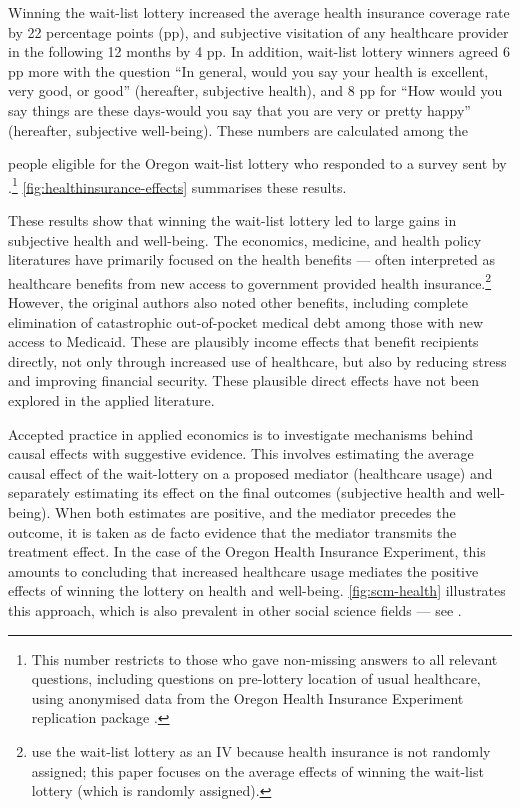Winning the wait-list lottery increased the average health insurance coverage rate by 22 percentage points (pp), and subjective visitation of any healthcare provider in the following 12 months by 4 pp.
In addition, wait-list lottery winners agreed 6 pp more with the question ``In general, would you say your health is excellent, very good, or good'' (hereafter, subjective health),
and 8 pp for ``How would you say things are these days-would you say that you are very  or pretty happy'' (hereafter, subjective well-being).
These numbers are calculated among the

people eligible for the Oregon wait-list lottery who responded to a survey sent by \cite{finkelstein2008oregon}.\footnote{
    This number restricts to those who gave non-missing answers to all relevant questions, including questions on pre-lottery location of usual healthcare,
    using anonymised data from the Oregon Health Insurance Experiment replication package \citep{icspr2014oregon}.
}
\autoref{fig:healthinsurance-effects} summarises these results.

These results show that winning the wait-list lottery led to large gains in subjective health and well-being.
The economics, medicine, and health policy literatures have primarily focused on the health benefits --- often interpreted as healthcare benefits from new access to government provided health insurance.\footnote{
    \cite{finkelstein2008oregon} use the wait-list lottery as an IV because health insurance is not randomly assigned; this paper focuses on the average effects of winning the wait-list lottery (which is randomly assigned).
}
However, the original authors also noted other benefits, including complete elimination of catastrophic out-of-pocket medical debt among those with new access to Medicaid.
These are plausibly income effects that benefit recipients directly, not only through increased use of healthcare, but also by reducing stress and improving financial security.
These plausible direct effects have not been explored in the applied literature.

Accepted practice in applied economics is to investigate mechanisms behind causal effects with suggestive evidence.
This involves estimating the average causal effect of the wait-lottery on a proposed mediator (healthcare usage) and separately estimating its effect on the final outcomes (subjective health and well-being).
When both estimates are positive, and the mediator precedes the outcome, it is taken as de facto evidence that the mediator transmits the treatment effect.
In the case of the Oregon Health Insurance Experiment, this amounts to concluding that increased healthcare usage mediates the positive effects of winning the lottery on health and well-being.
\autoref{fig:scm-health} illustrates this approach, which is also prevalent in other social science fields --- see \cite{blackwell2024assumption,green2010enough}.

